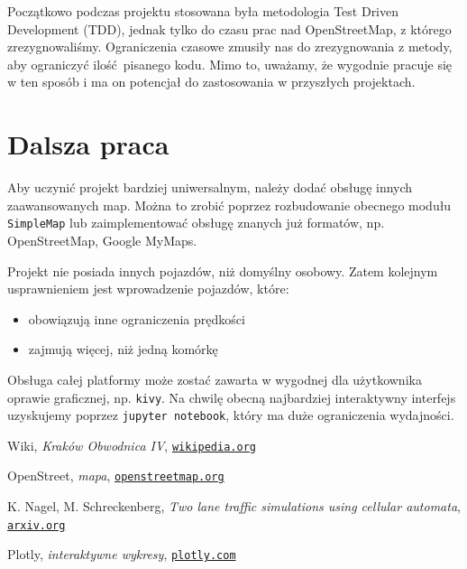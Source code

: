 \documentclass[a4paper,12pt]{article}
\begin{document}
    Początkowo podczas projektu stosowana była metodologia Test Driven Development (TDD), jednak tylko do czasu prac nad OpenStreetMap, z którego zrezygnowaliśmy. Ograniczenia czasowe zmusiły nas do zrezygnowania z metody, aby ograniczyć ilość pisanego kodu. Mimo to, uważamy, że wygodnie pracuje się w ten sposób i ma on potencjał do zastosowania w przyszłych projektach.

    \section{Dalsza praca}
    Aby uczynić projekt bardziej uniwersalnym, należy dodać obsługę innych zaawansowanych map.
    Można to zrobić poprzez rozbudowanie obecnego modułu \texttt{SimpleMap} lub zaimplementować obsługę znanych już formatów, np. OpenStreetMap, Google MyMaps.
    
    Projekt nie posiada innych pojazdów, niż domyślny osobowy. Zatem kolejnym usprawnieniem jest wprowadzenie pojazdów, które: 
    \begin{itemize}
    	\item obowiązują inne ograniczenia prędkości
    	\item zajmują więcej, niż jedną komórkę
    \end{itemize}

	Obsługa całej platformy może zostać zawarta w wygodnej dla użytkownika oprawie graficznej, np. \texttt{kivy}. Na chwilę obecną najbardziej interaktywny interfejs uzyskujemy poprzez \texttt{jupyter notebook}, który ma duże ograniczenia wydajności.

	\pagebreak
	\begin{thebibliography}{15}
		Wiki, \textit{Kraków Obwodnica IV},
		\texttt{\href{https://pl.wikipedia.org/wiki/Obwodnice_Krakowa\#IV_obwodnica}{wikipedia.org}}
		
		OpenStreet, \textit{mapa},
		\texttt{\href{https://www.openstreetmap.org/}{openstreetmap.org}}
		
		K. Nagel, M. Schreckenberg, \textit{Two lane traffic simulations using cellular automata},
		\texttt{\href{https://arxiv.org/pdf/cond-mat/9512119.pdf}{arxiv.org}}
		
		Plotly, \textit{interaktywne wykresy},
		\texttt{\href{https://plotly.com/}{plotly.com}}
	\end{thebibliography}
	
\end{document}
